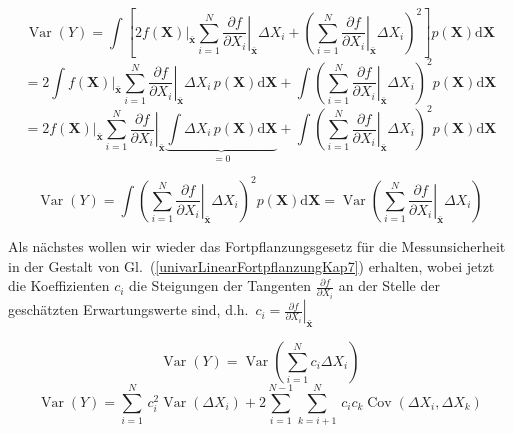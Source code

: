 \begin{equation*}
\operatorname{Var}(Y)
= \int \left[
2   \left. f(\mathbf{X}) \right|_{\bar{\mathbf{x}}}
\sum_{i=1}^N \left.
\frac{\partial f}{\partial X_i} \right|_{\bar{\mathbf{x}}} \Delta X_i
+ \left(
\sum_{i=1}^N \left.
\frac{\partial f}{\partial X_i} \right|_{\bar{\mathbf{x}}} \Delta X_i
 \right)^2
\right]  p(\mathbf{X}) \mathrm{d} \mathbf{X}
\end{equation*}
\begin{equation*}
= 2 \int   \left. f(\mathbf{X}) \right|_{\bar{\mathbf{x}}}
\sum_{i=1}^N \left.
\frac{\partial f}{\partial X_i} \right|_{\bar{\mathbf{x}}} \Delta X_i
\,  p(\mathbf{X}) \mathrm{d} \mathbf{X}
+ \int \left(
\sum_{i=1}^N \left.
\frac{\partial f}{\partial X_i} \right|_{\bar{\mathbf{x}}} \Delta X_i
 \right)^2
 p(\mathbf{X}) \mathrm{d} \mathbf{X}
\end{equation*}
\begin{equation*}
= 2 \left. f(\mathbf{X}) \right|_{\bar{\mathbf{x}}}  \sum_{i=1}^N \left.
\frac{\partial f}{\partial X_i} \right|_{\bar{\mathbf{x}}}
\underbrace{\int  \Delta X_i \, p(\mathbf{X}) \mathrm{d} \mathbf{X}}_{= 0}
+ \int \left(
\sum_{i=1}^N \left.
\frac{\partial f}{\partial X_i} \right|_{\bar{\mathbf{x}}} \Delta X_i
 \right)^2
 p(\mathbf{X}) \mathrm{d} \mathbf{X}
\end{equation*}

\begin{equation}
\operatorname{Var}(Y)
=
\int \left(
\sum_{i=1}^N \left.
\frac{\partial f}{\partial X_i} \right|_{\bar{\mathbf{x}}} \Delta X_i
 \right)^2
 p(\mathbf{X}) \mathrm{d} \mathbf{X}
=
\operatorname{Var}\left(\sum_{i=1}^N \left. \frac{\partial f}{\partial X_i} \right|_{\bar{\mathbf{x}}} \Delta X_i\right)
\end{equation}

Als nächstes wollen wir wieder das Fortpflanzungsgesetz für die Messunsicherheit
in der Gestalt von Gl.~(\ref{univarLinearFortpflanzungKap7}) erhalten, wobei jetzt die Koeffizienten
$c_i$ die Steigungen der Tangenten $\frac{\partial f}{\partial X_i}$ an der Stelle
der geschätzten Erwartungswerte sind, d.h.\
$c_i = \left. \frac{\partial f}{\partial X_i} \right|_{\bar{\mathbf{x}}}$

\begin{equation}
\operatorname{Var}(Y)
= \operatorname{Var}\left(\sum_{i=1}^N c_i \Delta X_i\right)
\end{equation}
\begin{equation}
\operatorname {Var}\left(Y\right)
= \sum _{{i=1}}^{N} \, c_i^2 \operatorname {Var}(\Delta X_{i})+2\sum _{{i=1}}^{{N-1}}
  \sum _{{k=i+1}}^{N} \, c_i c_k \operatorname {Cov}(\Delta X_{i},\Delta X_{k})
\label{UnsicherFortpflLinearisiert}
\end{equation}

